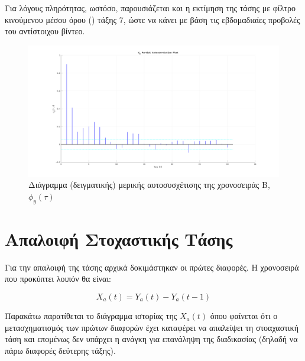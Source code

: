\par Για λόγους πληρότητας, ωστόσο, παρουσιάζεται και η εκτίμηση της τάσης με φίλτρο κινούμενου μέσου όρου () τάξης 7, ώστε να κάνει  με βάση τις εβδομαδιαίες προβολές του αντίστοιχου βίντεο.

\begin{figure}[H]
    \begin{center}
        \includegraphics[width=\textwidth]{plots/yb_initial_partial_autocorrelation.svg.pdf}
        \caption{Διάγραμμα (δειγματικής) μερικής αυτοσυσχέτισης της χρονοσειράς B, $\phi_y(\tau)$}
        \label{fig:yb_initial_partial_autocorrelation}
    \end{center}
\end{figure}

\section{Απαλοιφή Στοχαστικής Τάσης}

Για την απαλοιφή της τάσης αρχικά δοκιμάστηκαν οι πρώτες διαφορές. Η χρονοσειρά που προκύπτει λοιπόν θα είναι:

\[ X_a(t) = Y_a(t) - Y_a(t-1) \]

Παρακάτω παρατίθεται το διάγραμμα ιστορίας της ${X_a(t)}$ όπου φαίνεται ότι ο μετασχηματισμός των πρώτων διαφορών έχει καταφέρει να απαλείψει τη στοαχαστική τάση και επομένως δεν υπάρχει η ανάγκη για επανάληψη της διαδικασίας (δηλαδή να πάρω διαφορές δεύτερης τάξης).

